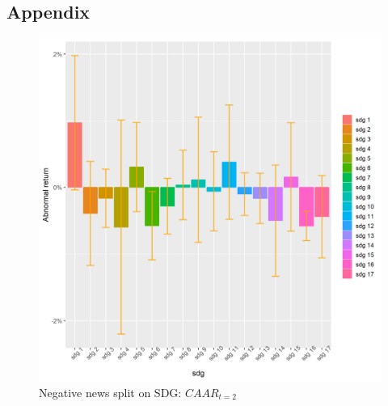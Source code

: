 \subsection{Appendix} \label{app: derivations}
\begin{figure} [H] 
    \centering
    \includegraphics[scale=0.6]{Projekt/1.Figures analysis/ST_negative_sdg_bar_2.png} 
    \caption{Negative news split on SDG: $CAAR_{t=2}$}
    \label{fig:ST_pos_news}
\end{figure}


